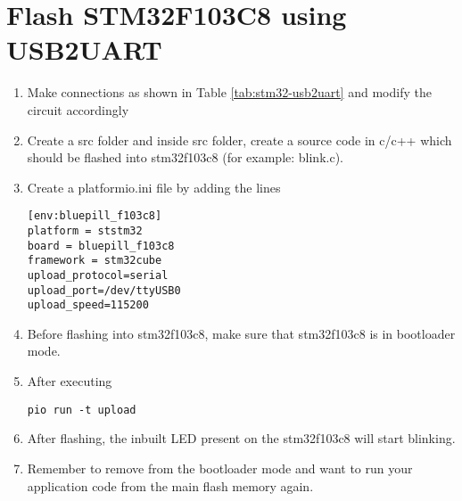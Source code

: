 \documentclass[12pt]{article}
\begin{document}
\section{Flash STM32F103C8 using USB2UART}

\renewcommand{\theequation}{\theenumi}
\renewcommand{\thefigure}{\theenumi}
\begin{enumerate}[label=\thesubsection.\arabic*.,ref=\thesubsection.\theenumi]
\item Make connections as shown in Table \ref{tab:stm32-usb2uart} and modify the circuit accordingly
			\begin{table}[!h]
			\centering
		
		\caption{}
		\label{tab:stm32-usb2uart}
	\end{table}
\item Create a src folder and inside src folder, create a source code in c/c++ which should be flashed into stm32f103c8 (for example: blink.c).
\item Create a platformio.ini file by adding the lines
\begin{lstlisting}
[env:bluepill_f103c8]
platform = ststm32
board = bluepill_f103c8
framework = stm32cube
upload_protocol=serial
upload_port=/dev/ttyUSB0
upload_speed=115200
\end{lstlisting}

\item Before flashing into stm32f103c8, make sure that stm32f103c8 is in bootloader mode.

\item After executing 
\begin{lstlisting}
pio run -t upload
\end{lstlisting}

\item After flashing, the inbuilt LED present on the stm32f103c8 will start blinking.

\item Remember to remove from the bootloader mode and want to run your application code from the main flash memory again.
\end{enumerate}
\end{document}
